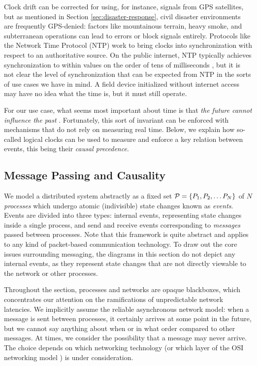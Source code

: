 \documentclass[]             %
{NASA}                       %
\theoremstyle{definition}
\begin{document}
Clock drift can be corrected for using, for instance, signals from GPS
satellites, but as mentioned in Section \ref{sec:disaster-response},
civil disaster environments are frequently GPS-denied: factors like
mountainous terrain, heavy smoke, and subterranean operations can lead
to errors or block signals entirely. Protocols like the Network Time
Protocol (NTP) \cite{rfc1119} work to bring clocks into
synchronization with respect to an authoritative source. On the public
internet, NTP typically achieves synchronization to within values on the
order of tens of milliseconds \cite{rfc1128}, but it is not clear the
level of synchronization that can be expected from NTP in the sorts of use
cases we have in mind. A field device initialized without internet
access may have no idea what the time is, but it must still operate.

For our use case, what seems most important about time is that
\emph{the future cannot influence the past}
\cite{1989mattern}. Fortunately, this sort of invariant can be
enforced with mechanisms that do not rely on measuring real
time. Below, we explain how so-called logical clocks can be used to
measure and enforce a key relation between events, this being their
\emph{causal precedence}.


\subsection{Message Passing and Causality}
\label{ssec:message-passing}
We model a distributed system abstractly as a fixed set
$\mathcal{P} = \{P_1, P_2, \ldots P_N\}$ of $N$ \emph{processes} which
undergo atomic (indivisible) state changes known as
\emph{events}. Events are divided into three types: internal events,
representing state changes inside a single process, and send and
receive events corresponding to \emph{messages} passed between
processes. Note that this framework is quite abstract and applies to
any kind of packet-based communication technology. To draw out the
core issues surrounding messaging, the diagrams in this section do not
depict any internal events, as they represent state changes that are
not directly viewable to the network or other processes.

Throughout the section, processes and networks are opaque blackboxes,
which concentrates our attention on the ramifications of unpredictable
network latencies. We implicitly assume the reliable asynchronous
network model: when a message is sent between processes, it certainly
arrives at some point in the future, but we cannot say anything about
when or in what order compared to other messages. At times, we
consider the possibility that a message may never arrive. The choice
depends on which networking technology (or which layer of the OSI
networking model \cite{1983:osi-reference-model}) is under
consideration.
\end{document}
